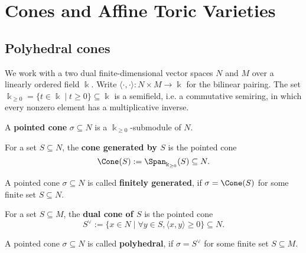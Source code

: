 \section{Cones and Affine Toric Varieties}

\subsection{Polyhedral cones}

We work with a two dual finite-dimensional vector spaces \( N \) and
\( M \) over a linearly ordered field \( \Bbbk \). Write \( \langle
\cdot, \cdot \rangle \colon N \times M \to \Bbbk \) for the bilinear
pairing. The set \(\Bbbk_{\geq 0} = \{t \in \Bbbk \mid t \geq 0 \}
\subseteq \Bbbk\) is a semifield, i.e. a commutative semiring, in
which every nonzero element has a multiplicative inverse.

\begin{definition}
  \label{1-2-1-pointed-cone}
  \uses{}
  \leanok
  A {\bf pointed cone} \( \sigma \subseteq N \) is a \( \Bbbk_{\geq 0}
  \)-submodule of \( N \).
\end{definition}

\begin{definition}
  \label{1-2-1-cone-span}
  \leanok
  For a set \( S \subseteq N \), the {\bf cone generated by \( S \)}
  is the pointed cone
  \[
      \Cone(S) := \Span_{\Bbbk_{\geq 0}}(S) \subseteq N.
  \]
\end{definition}

\begin{definition}
  \label{1-2-1-cone-finitely-generated}
  \leanok
  A pointed cone \( \sigma \subseteq N \) is called {\bf finitely
  generated}, if \( \sigma = \Cone(S) \) for some finite set \( S
  \subseteq N \).
\end{definition}

\begin{definition}
  \label{1-2-1-cone-dual}
  \leanok
  For a set \( S \subseteq M \), the {\bf dual cone of \( S \)} is
  the pointed cone
  \[
      S^\vee := \{x \in N \mid \forall y \in S, \langle x, y \rangle
      \geq 0 \} \subseteq N.
  \]
\end{definition}

\begin{definition}
  \label{1-2-1-polyhedral-cone}
  \leanok
  A pointed cone \( \sigma \subseteq N \) is called {\bf polyhedral},
  if \( \sigma = S^\vee \) for some finite set \( S \subseteq M \).
\end{definition}

